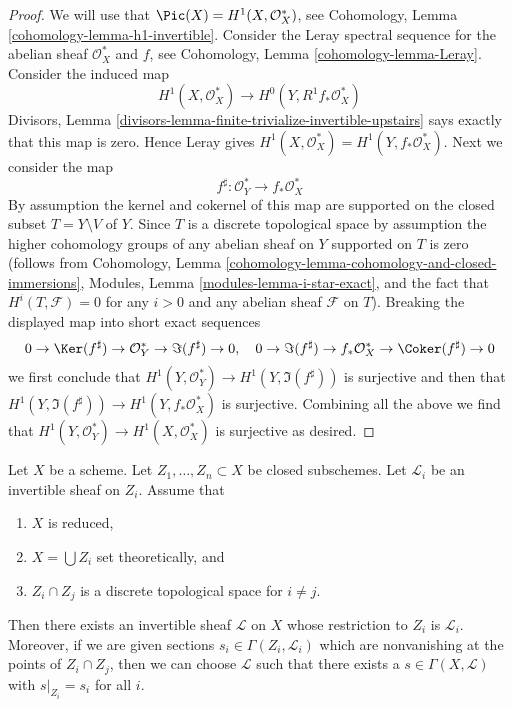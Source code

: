 \begin{proof}
We will use that $\Pic(X) = H^1(X, \mathcal{O}_X^*)$, see
Cohomology, Lemma \ref{cohomology-lemma-h1-invertible}.
Consider the Leray spectral sequence for the abelian sheaf $\mathcal{O}_X^*$
and $f$, see Cohomology, Lemma \ref{cohomology-lemma-Leray}.
Consider the induced map
$$
H^1(X, \mathcal{O}_X^*) \longrightarrow H^0(Y, R^1f_*\mathcal{O}_X^*)
$$
Divisors, Lemma \ref{divisors-lemma-finite-trivialize-invertible-upstairs}
says exactly that this map is zero. Hence Leray gives
$H^1(X, \mathcal{O}_X^*) = H^1(Y, f_*\mathcal{O}_X^*)$.
Next we consider the map
$$
f^\sharp : \mathcal{O}_Y^* \longrightarrow f_*\mathcal{O}_X^*
$$
By assumption the kernel and cokernel of this map are supported
on the closed subset $T = Y \setminus V$ of $Y$.
Since $T$ is a discrete topological space by assumption
the higher cohomology groups of any abelian sheaf on $Y$ supported
on $T$ is zero (follows from
Cohomology, Lemma \ref{cohomology-lemma-cohomology-and-closed-immersions},
Modules, Lemma \ref{modules-lemma-i-star-exact}, and
the fact that $H^i(T, \mathcal{F}) = 0$ for any $i > 0$
and any abelian sheaf $\mathcal{F}$ on $T$).
Breaking the displayed map into short exact sequences
$$
0 \to \Ker(f^\sharp) \to \mathcal{O}_Y^* \to \Im(f^\sharp) \to 0,\quad
0 \to \Im(f^\sharp) \to f_*\mathcal{O}_X^* \to \Coker(f^\sharp) \to 0
$$
we first conclude that $H^1(Y, \mathcal{O}_Y^*) \to H^1(Y, \Im(f^\sharp))$
is surjective and then that
$H^1(Y, \Im(f^\sharp)) \to H^1(Y, f_*\mathcal{O}_X^*)$ is surjective.
Combining all the above we find that $H^1(Y, \mathcal{O}_Y^*) \to
H^1(X, \mathcal{O}_X^*)$ is surjective as desired.
\end{proof}

\begin{lemma}
\label{lemma-glue-invertible-sheaves}
Let $X$ be a scheme. Let $Z_1, \ldots, Z_n \subset X$ be closed
subschemes. Let $\mathcal{L}_i$ be an invertible sheaf on $Z_i$.
Assume that
\begin{enumerate}
\item $X$ is reduced,
\item $X = \bigcup Z_i$ set theoretically, and
\item $Z_i \cap Z_j$ is a discrete topological space for $i \not = j$.
\end{enumerate}
Then there exists an invertible sheaf $\mathcal{L}$ on $X$ whose restriction
to $Z_i$ is $\mathcal{L}_i$. Moreover, if we are given sections
$s_i \in \Gamma(Z_i, \mathcal{L}_i)$ which are nonvanishing at the
points of $Z_i \cap Z_j$, then we can choose $\mathcal{L}$ such
that there exists a $s \in \Gamma(X, \mathcal{L})$ with
$s|_{Z_i} = s_i$ for all $i$.
\end{lemma}

